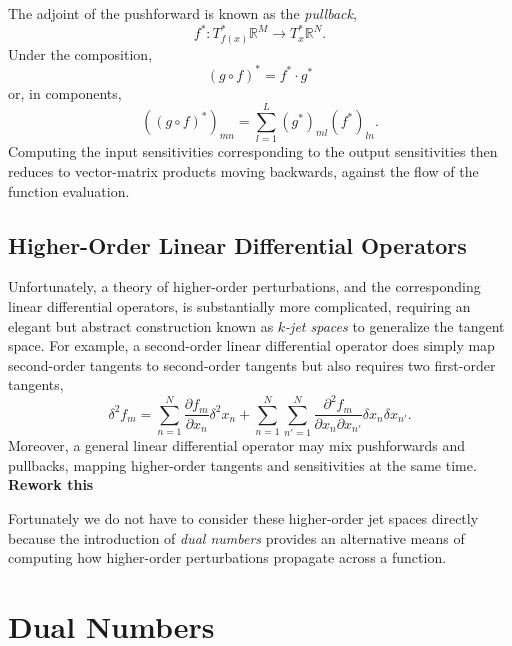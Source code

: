 The adjoint of the pushforward is known as the \textit{pullback},
%
\begin{equation*}
f^{*} : T^{*}_{f (x) } \mathbb{R}^{M} \rightarrow T^{*}_{x} \mathbb{R}^{N}.
\end{equation*}
%
Under the composition,
%
\begin{equation*}
\left( g \circ f \right)^{*} = f^{*} \cdot g^{*}
\end{equation*}
%
or, in components,
%
\begin{equation*}
\left( \left( g \circ f \right)^{*} \right)_{mn} = 
\sum_{l = 1}^{L} \left( g^{*} \right)_{ml} \left( f^{*} \right)_{ln}.
\end{equation*}
%
Computing the input sensitivities corresponding to the output sensitivities then reduces
to vector-matrix products moving backwards, against the flow of the function evaluation.

\subsection{Higher-Order Linear Differential Operators}

Unfortunately, a theory of higher-order perturbations, and the corresponding
linear differential operators, is substantially more complicated, requiring an elegant but
abstract construction known as \textit{$k$-jet spaces} to generalize the tangent space.  
For example, a second-order linear differential operator does simply map second-order 
tangents to second-order tangents but also requires two first-order tangents,
%
 \begin{equation*}
\delta^{2} f_{m} 
= \sum_{n = 1}^{N} \frac{ \partial f_{m} }{ \partial x_{n} } \delta^{2} x_{n} 
+ \sum_{n = 1}^{N} \sum_{n' = 1}^{N} 
\frac{ \partial^{2} f_{m} }{ \partial x_{n} \partial x_{n'} } 
\delta x_{n} \delta x_{n'}.
\end{equation*}
%
Moreover, a general linear differential operator may mix pushforwards and pullbacks,
mapping higher-order tangents and sensitivities at the same time.  \textbf{Rework this}

Fortunately we do not have to consider these higher-order jet spaces directly
because the introduction of \textit{dual numbers} provides an alternative means
of computing how higher-order perturbations propagate across a function.

\section{Dual Numbers}


